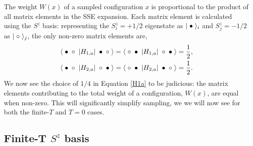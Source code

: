 \documentclass[vecphys]{svmult}
\begin{document}
The weight $W(x)$ of a sampled configuration $x$ is proportional to the product of all matrix elements in the SSE expansion.  Each matrix element is calculated using the $S^z$ basis: representing the $S^z_i=+1/2$ eigenstate as $|\hspace{1mm} \bullet \hspace{1mm} \rangle_i$ and  $S^z_j=-1/2$ as $|\hspace{1mm} \circ \hspace{1mm} \rangle_j$, the only non-zero matrix elements are,
\begin{eqnarray}
\langle \hspace{1mm} \bullet \hspace{1mm}  \circ \hspace{1mm}  | H_{1,a} | \hspace{1mm} \bullet \hspace{1mm} \circ \hspace{1mm} \rangle = 
\langle \hspace{1mm} \circ \hspace{1mm}  \bullet \hspace{1mm}  | H_{1,a} | \hspace{1mm} \circ \hspace{1mm} \bullet \hspace{1mm} \rangle = \frac{1}{2}, \label {Hdiag} \\
\langle \hspace{1mm} \bullet \hspace{1mm}  \circ \hspace{1mm}  | H_{2,a} | \hspace{1mm} \circ \hspace{1mm} \bullet \hspace{1mm} \rangle =
\langle \hspace{1mm} \circ \hspace{1mm}  \bullet \hspace{1mm}  | H_{2,a} | \hspace{1mm} \bullet \hspace{1mm} \circ \hspace{1mm} \rangle =
\frac{1}{2}. \label{Hod}
\end{eqnarray} 
We now see the choice of $1/4$ in Equation \ref{H1a} to be judicious: the matrix elements contributing to the total weight of a configuration, $W(x)$, are equal when non-zero.  This will significantly simplify sampling, we we will now see for both the finite-$T$ and $T=0$ cases.


\subsection{Finite-T $S^z$ basis} \label{HeisfiniteT}
\end{document}

